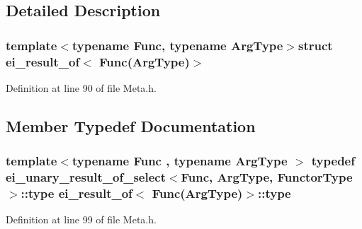 \subsection{Detailed Description}
\subsubsection*{template$<$typename Func, typename Arg\-Type$>$struct ei\-\_\-result\-\_\-of$<$ Func(\-Arg\-Type)$>$}



Definition at line 90 of file Meta.\-h.



\subsection{Member Typedef Documentation}
\hypertarget{structei__result__of_3_01_func_07_arg_type_08_4_a3275fde7dfaab9126b7149dcc91df84e}{
\subsubsection[{type}]{\setlength{\rightskip}{0pt plus 5cm}template$<$typename Func , typename Arg\-Type $>$ typedef {\bf ei\-\_\-unary\-\_\-result\-\_\-of\-\_\-select}$<$Func, Arg\-Type, {\bf Functor\-Type}$>$\-::{\bf type} {\bf ei\-\_\-result\-\_\-of}$<$ Func(Arg\-Type)$>$\-::{\bf type}}}\label{structei__result__of_3_01_func_07_arg_type_08_4_a3275fde7dfaab9126b7149dcc91df84e}


Definition at line 99 of file Meta.\-h.



